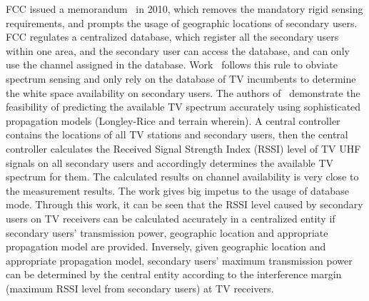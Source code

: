 FCC issued a memorandum~\cite{FCC_2010_sedond_memorandumm,FCCdatabasae} in 2010, which removes the mandatory rigid sensing requirements, and prompts the usage of geographic locations of secondary users.
FCC regulates a centralized database, which register all the secondary users within one area, and the secondary user can access the database, and can only use the channel assigned in the database.
Work~\cite{SenseLess2011} follows this rule to obviate spectrum sensing and only rely on the database of TV incumbents to determine the white space availability on secondary users. 
The authors of~\cite{SenseLess2011} demonstrate the feasibility of predicting the available TV spectrum accurately using sophisticated propagation models (Longley-Rice and terrain wherein). 
A central controller contains the locations of all TV stations and secondary users, then the central controller calculates the Received Signal Strength Index (\gls{RSSI}) level of TV \gls{UHF} signals on all secondary users and accordingly determines the available TV spectrum for them. 
The calculated results on channel availability is very close to the measurement results.
The work gives big impetus to the usage of database mode.
Through this work, it can be seen that the RSSI level caused by secondary users on TV receivers can be calculated accurately in a centralized entity if secondary users' transmission power, geographic location and appropriate propagation model are provided. 
Inversely, given geographic location and appropriate propagation model, secondary users' maximum transmission power can be determined by the central entity according to the interference margin (maximum RSSI level from secondary users) at TV receivers. 



